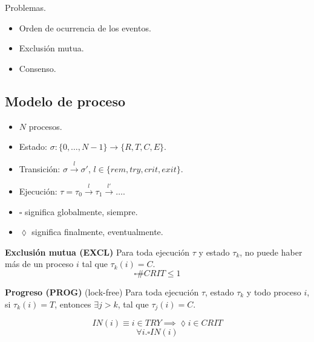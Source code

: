 \documentclass[11pt, spanish]{report}
\newcommand{\transition}{l}
\newcommand{\globally}{\square}
\newcommand{\finally}{\lozenge}
\begin{document}
Problemas.
\begin{itemize}
  \item Orden de ocurrencia de los eventos.
  \item Exclusión mutua.
  \item Consenso.
\end{itemize}

\subsection{Modelo de proceso}





\begin{itemize}
  \item $N$ procesos.
  \item Estado: $\sigma : \{0,\dots,N-1\} \to \{R, T, C, E\}$.
  \item Transición: $\sigma \xrightarrow{\transition} \sigma'$, $\transition \in \{rem, try, crit, exit\}$.
  \item Ejecución: $\tau = \tau_0 \xrightarrow{\transition} \tau_1 \xrightarrow{\transition'} \dots$.
  \item $\globally$ significa globalmente, siempre.
  \item $\finally$ significa finalmente, eventualmente.
\end{itemize}

\textbf{Exclusión mutua (EXCL)}
Para toda ejecución $\tau$ y estado $\tau_k$, no puede haber más de un proceso $i$ tal que $\tau_k(i) = C$.
\[\globally \#CRIT \leq 1\]

\textbf{Progreso (PROG)} (lock-free)
Para toda ejecución $\tau$, estado $\tau_k$ y todo proceso $i$, si $\tau_k(i) = T$, entonces $\exists j > k$, tal que $\tau_j(i) = C$.

\[IN(i) \equiv i\in TRY \implies \finally i \in CRIT\]
\[\forall i . \globally IN(i)\]
\end{document}
